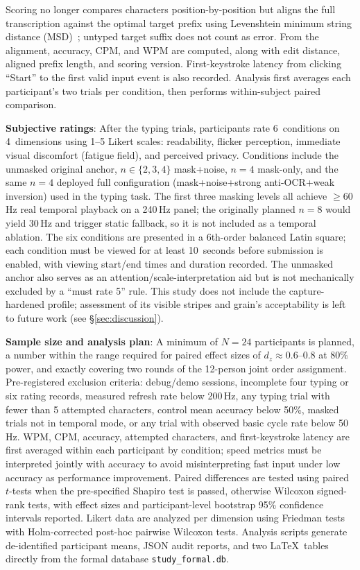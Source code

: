 \documentclass{ieeeaccess}
\begin{document}
Scoring no longer compares characters position-by-position but aligns the full transcription against the optimal target prefix using Levenshtein minimum string distance (MSD)~\cite{b_soukoreff2003}; untyped target suffix does not count as error. From the alignment, accuracy, CPM, and WPM are computed, along with edit distance, aligned prefix length, and scoring version. First-keystroke latency from clicking ``Start'' to the first valid input event is also recorded. Analysis first averages each participant's two trials per condition, then performs within-subject paired comparison.

\textbf{Subjective ratings}: After the typing trials, participants rate 6~conditions on 4~dimensions using 1--5 Likert scales: readability, flicker perception, immediate visual discomfort (fatigue field), and perceived privacy. Conditions include the unmasked original anchor, $n\in\{2,3,4\}$ mask+noise, $n=4$ mask-only, and the same $n=4$ deployed full configuration (mask+noise+strong anti-OCR+weak inversion) used in the typing task. The first three masking levels all achieve $\geq$60\,Hz real temporal playback on a 240\,Hz panel; the originally planned $n=8$ would yield 30\,Hz and trigger static fallback, so it is not included as a temporal ablation. The six conditions are presented in a 6th-order balanced Latin square; each condition must be viewed for at least 10~seconds before submission is enabled, with viewing start/end times and duration recorded. The unmasked anchor also serves as an attention/scale-interpretation aid but is not mechanically excluded by a ``must rate 5'' rule. This study does not include the capture-hardened profile; assessment of its visible stripes and grain's acceptability is left to future work (see \S\ref{sec:discussion}).

\textbf{Sample size and analysis plan}: A minimum of $N=24$ participants is planned, a number within the range required for paired effect sizes of $d_z\approx0.6$--$0.8$ at 80\% power, and exactly covering two rounds of the 12-person joint order assignment. Pre-registered exclusion criteria: debug/demo sessions, incomplete four typing or six rating records, measured refresh rate below 200\,Hz, any typing trial with fewer than 5 attempted characters, control mean accuracy below 50\%, masked trials not in temporal mode, or any trial with observed basic cycle rate below 50\,Hz. WPM, CPM, accuracy, attempted characters, and first-keystroke latency are first averaged within each participant by condition; speed metrics must be interpreted jointly with accuracy to avoid misinterpreting fast input under low accuracy as performance improvement. Paired differences are tested using paired $t$-tests when the pre-specified Shapiro test is passed, otherwise Wilcoxon signed-rank tests, with effect sizes and participant-level bootstrap 95\% confidence intervals reported. Likert data are analyzed per dimension using Friedman tests with Holm-corrected post-hoc pairwise Wilcoxon tests. Analysis scripts generate de-identified participant means, JSON audit reports, and two \LaTeX\ tables directly from the formal database \texttt{study\_formal.db}.
\end{document}
